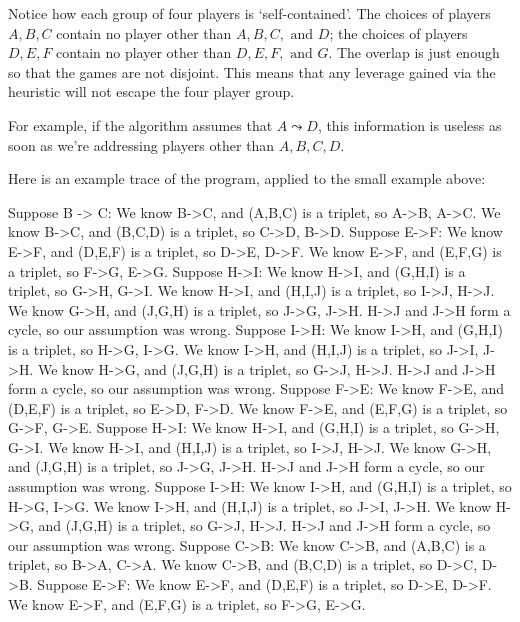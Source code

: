 \documentclass[12pt]{article}
\begin{document}
    Notice how each group of four players is `self-contained'. The choices of players $A,B,C$ contain no player other than $A,B,C, \text{ and } D$; the choices of players $D, E, F$ contain no player other than $D, E, F, \text{ and } G$. The overlap is just enough so that the games are not disjoint. This means that any leverage gained via the heuristic will not escape the four player group.

    For example, if the algorithm assumes that $A \leadsto D$, this information is useless as soon as we're addressing players other than $A,B,C,D$.

    Here is an example trace of the program, applied to the small example above:
    \begin{verbatimtab}
Suppose B -> C:
    We know B->C, and (A,B,C) is a triplet, so A->B, A->C.
    We know B->C, and (B,C,D) is a triplet, so C->D, B->D.
    Suppose E->F:
        We know E->F, and (D,E,F) is a triplet, so D->E, D->F.
        We know E->F, and (E,F,G) is a triplet, so F->G, E->G.
        Suppose H->I:
            We know H->I, and (G,H,I) is a triplet, so G->H, G->I.
            We know H->I, and (H,I,J) is a triplet, so I->J, H->J.
            We know G->H, and (J,G,H) is a triplet, so J->G, J->H.
            H->J and J->H form a cycle, so our assumption was wrong.
        Suppose I->H:
            We know I->H, and (G,H,I) is a triplet, so H->G, I->G.
            We know I->H, and (H,I,J) is a triplet, so J->I, J->H.
            We know H->G, and (J,G,H) is a triplet, so G->J, H->J.
            H->J and J->H form a cycle, so our assumption was wrong.
    Suppose F->E:
        We know F->E, and (D,E,F) is a triplet, so E->D, F->D.
        We know F->E, and (E,F,G) is a triplet, so G->F, G->E.
        Suppose H->I:
            We know H->I, and (G,H,I) is a triplet, so G->H, G->I.
            We know H->I, and (H,I,J) is a triplet, so I->J, H->J.
            We know G->H, and (J,G,H) is a triplet, so J->G, J->H.
            H->J and J->H form a cycle, so our assumption was wrong.
        Suppose I->H:
            We know I->H, and (G,H,I) is a triplet, so H->G, I->G.
            We know I->H, and (H,I,J) is a triplet, so J->I, J->H.
            We know H->G, and (J,G,H) is a triplet, so G->J, H->J.
            H->J and J->H form a cycle, so our assumption was wrong.
Suppose C->B:
    We know C->B, and (A,B,C) is a triplet, so B->A, C->A.
    We know C->B, and (B,C,D) is a triplet, so D->C, D->B.
    Suppose E->F:
        We know E->F, and (D,E,F) is a triplet, so D->E, D->F.
        We know E->F, and (E,F,G) is a triplet, so F->G, E->G.

\end{verbatimtab}
\end{document}
